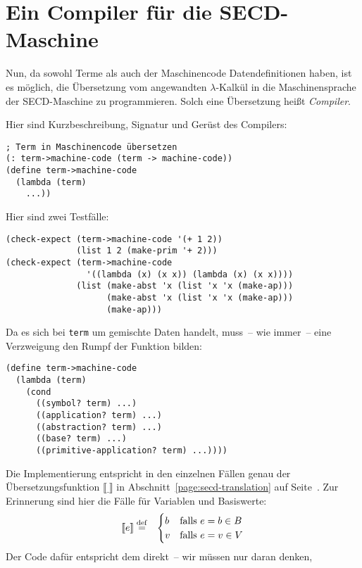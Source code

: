 \section{Ein Compiler für die SECD-Maschine}

Nun, da sowohl Terme als auch der Maschinencode Datendefinitionen
haben, ist es möglich, die Übersetzung vom angewandten
$\lambda$-Kalkül in die Maschinensprache der SECD-Maschine zu
programmieren.  Solch eine Übersetzung heißt \textit{Compiler}.

Hier sind Kurzbeschreibung, Signatur und Gerüst des Compilers:
%
\begin{lstlisting}
; Term in Maschinencode übersetzen
(: term->machine-code (term -> machine-code))
(define term->machine-code
  (lambda (term)
    ...))
\end{lstlisting}
%
Hier sind zwei Testfälle:
%
\begin{lstlisting}
(check-expect (term->machine-code '(+ 1 2))
              (list 1 2 (make-prim '+ 2)))
(check-expect (term->machine-code 
                '((lambda (x) (x x)) (lambda (x) (x x))))
              (list (make-abst 'x (list 'x 'x (make-ap)))
                    (make-abst 'x (list 'x 'x (make-ap)))
                    (make-ap)))
\end{lstlisting}
%
Da es sich bei \lstinline{term} um gemischte Daten handelt, muss~-- wie
immer~-- eine Verzweigung den Rumpf der Funktion bilden:
%
\begin{lstlisting}
(define term->machine-code
  (lambda (term)
    (cond
      ((symbol? term) ...)
      ((application? term) ...)
      ((abstraction? term) ...)
      ((base? term) ...)
      ((primitive-application? term) ...))))
\end{lstlisting}
%
Die Implementierung entspricht in den einzelnen Fällen genau der
Übersetzungsfunktion $\llbracket\underline{~}\rrbracket$ in
Abschnitt~\ref{page:secd-translation} auf
Seite~\pageref{page:secd-translation}. Zur Erinnerung sind hier die Fälle für Variablen und
Basiswerte:
\begin{eqnarray*}
    \llbracket e \rrbracket &\stackrel{\rm def}{=}&
  \begin{cases}
    b & \textrm{falls $e = b \in B$}\\
    v & \textrm{falls $e = v \in V$}\\
  \end{cases}
\end{eqnarray*}
%
Der Code dafür entspricht dem direkt~-- wir müssen nur daran denken,
